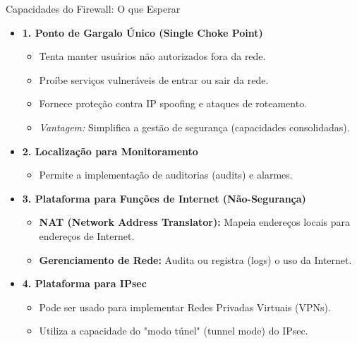 \begin{frame}{Capacidades do Firewall: O que Esperar}
    \begin{itemize}
        \item \textbf{1. Ponto de Gargalo Único (Single Choke Point)}
              \begin{itemize}
                  \item Tenta manter usuários não autorizados fora da rede.
                  \item Proíbe serviços vulneráveis de entrar ou sair da rede.
                  \item Fornece proteção contra IP spoofing e ataques de roteamento.
                  \item \textit{Vantagem:} Simplifica a gestão de segurança (capacidades consolidadas).
              \end{itemize}

        \item \textbf{2. Localização para Monitoramento}
              \begin{itemize}
                  \item Permite a implementação de auditorias (audits) e alarmes.
              \end{itemize}

        \item \textbf{3. Plataforma para Funções de Internet (Não-Segurança)}
              \begin{itemize}
                  \item \textbf{NAT (Network Address Translator):} Mapeia endereços locais para endereços de Internet.
                  \item \textbf{Gerenciamento de Rede:} Audita ou registra (logs) o uso da Internet.
              \end{itemize}

        \item \textbf{4. Plataforma para IPsec}
              \begin{itemize}
                  \item Pode ser usado para implementar Redes Privadas Virtuais (VPNs).
                  \item Utiliza a capacidade do "modo túnel" (tunnel mode) do IPsec.
              \end{itemize}
    \end{itemize}
\end{frame}

